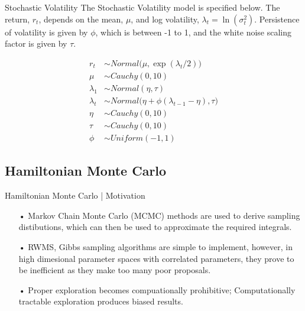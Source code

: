 \documentclass[11pt]{beamer}
\begin{document}
\begin{frame}{Stochastic Volatility}
The Stochastic Volatility model is specified below. The return, $r_t$, depends on the mean, $\mu$, and log volatility, $\lambda_t = \ln(\sigma^2_t)$. Persistence of volatility is given by $\phi$, which is between -1 to 1, and the white noise scaling factor is given by $\tau$.

\begin{align}
r_t &\sim Normal\bigl(\mu, \exp({\lambda_t/2})\bigr) \\
\mu &\sim Cauchy(0, 10) \\
\lambda_1 &\sim Normal(\eta, \tau) \\
\lambda_t &\sim Normal\bigl(\eta + \phi(\lambda_{t-1} - \eta), \tau\bigr) \\
\eta &\sim Cauchy(0, 10) \\
\tau &\sim Cauchy(0, 10) \\
\phi &\sim Uniform(-1, 1)
\end{align}

\end{frame}


\subsection{Hamiltonian Monte Carlo}
\begin{frame}{Hamiltonian Monte Carlo | Motivation}
\begin{enumerate}
\item[•] Markov Chain Monte Carlo (MCMC) methods are used to derive sampling distibutions, which can then be used to approximate the required integrals.

\item[•] RWMS, Gibbs sampling algorithms are simple to implement, however, in high dimesional parameter spaces with correlated parameters, they prove to be inefficient as they make too many poor proposals.

\item[•] Proper exploration becomes compuationally prohibitive; Computationally tractable exploration produces biased results.

\end{enumerate}

\end{frame}
\end{document}

